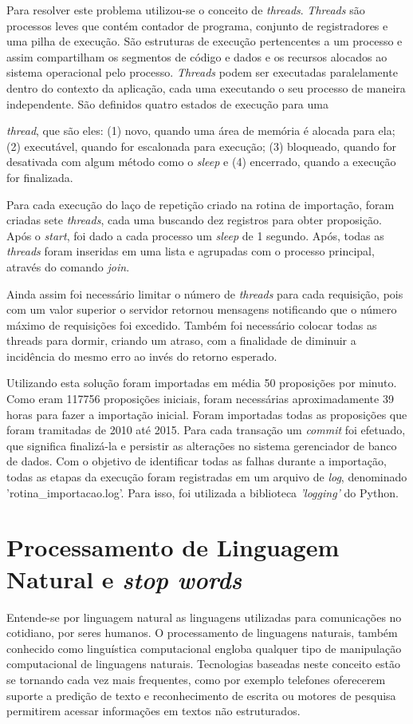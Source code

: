 \documentclass[
	12pt,				%
	openright,			%
	twoside,			%
	a4paper,			%
	english,			%
	french,				%
	spanish,			%
	brazil				%
	]{abntex2}
\begin{document}
Para resolver este problema utilizou-se o conceito de \emph{threads}. \emph{Threads} são processos leves que contém contador de programa, conjunto
de registradores e uma pilha de execução. São estruturas de execução pertencentes a um processo e assim compartilham os segmentos de
código e dados e os recursos alocados ao sistema operacional pelo processo. \emph{Threads} podem ser executadas paralelamente dentro do
contexto da aplicação, cada uma executando o seu processo de maneira independente. São definidos quatro estados de execução para 
uma {\emph{thread}, que são eles: (1) novo, quando uma área de memória é alocada para ela; (2) executável, quando for escalonada para
execução; (3) bloqueado, quando for desativada com algum método como o \emph{sleep} e (4) encerrado, quando a execução for finalizada.

Para cada execução do laço de repetição criado na rotina de importação, foram criadas sete \emph{threads}, cada uma buscando dez
registros para obter proposição. Após o \emph{start}, foi dado a cada processo um \emph{sleep} de 1 segundo. Após, todas as
\emph{threads} foram inseridas em uma lista e agrupadas com o processo principal, através do comando \emph{join}.

Ainda assim foi necessário limitar o número de \emph{threads} para cada requisição, pois com um valor superior o servidor 
retornou mensagens notificando que o número máximo de requisições foi excedido. Também foi necessário colocar todas as threads 
para dormir, criando um atraso, com a finalidade de diminuir a incidência do mesmo erro ao invés do retorno esperado. 

Utilizando esta solução foram importadas em média 50 proposições por minuto. Como eram 117756 proposições iniciais, foram necessárias 
aproximadamente 39 horas para fazer a importação inicial. Foram importadas todas as proposições que foram tramitadas de 2010 até 2015. Para 
cada transação um \emph{commit} foi efetuado, que significa finalizá-la e persistir as alterações no sistema gerenciador de banco de dados.
Com o objetivo de identificar todas as falhas durante a importação, todas as etapas da execução foram registradas em um arquivo de \emph{log}, denominado
'rotina\_importacao.log'. Para isso, foi utilizada a biblioteca \emph{'logging'} do Python.

\section{Processamento de Linguagem Natural e \emph{stop words}}
Entende-se por linguagem natural as linguagens utilizadas para comunicações no cotidiano, por seres humanos. O processamento de
linguagens naturais, também conhecido como linguística computacional engloba qualquer tipo de manipulação computacional de 
linguagens naturais. Tecnologias baseadas neste conceito estão se tornando cada vez mais frequentes, como por exemplo telefones
oferecerem suporte a predição de texto e reconhecimento de escrita ou motores de pesquisa permitirem acessar informações em textos
não estruturados. \cite{nltk}

}
\end{document}
